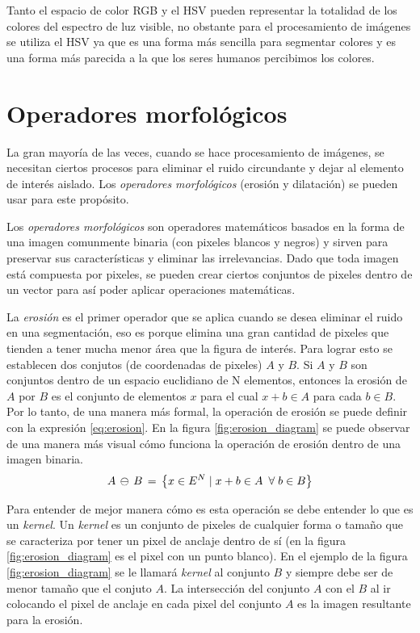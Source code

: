 Tanto el espacio de color RGB y el HSV pueden representar la totalidad de los colores del espectro de luz visible, no obstante para el procesamiento de imágenes se utiliza el HSV ya que es una forma más sencilla para segmentar colores y es una forma más parecida a la que los seres humanos percibimos los colores.

	\section{Operadores morfológicos}	
La gran mayoría de las veces, cuando se hace procesamiento de imágenes, se necesitan ciertos procesos para eliminar el ruido circundante y dejar al elemento de interés aislado. Los \textit{operadores morfológicos} (erosión y dilatación) se pueden usar para este propósito.

Los \textit{operadores morfológicos} son operadores matemáticos basados en la forma de una imagen comunmente binaria (con pixeles blancos y negros) y sirven para preservar sus características y eliminar las irrelevancias. Dado que toda imagen está compuesta por pixeles, se pueden crear ciertos conjuntos de pixeles dentro de un vector para así poder aplicar operaciones matemáticas. 

La \textit{erosión} es el primer operador que se aplica cuando se desea eliminar el ruido en una segmentación, eso es porque elimina una gran cantidad de pixeles que tienden a tener mucha menor área que la figura de interés. Para lograr esto se establecen dos conjutos (de coordenadas de pixeles) $A$ y $B$. Si $A$ y $B$ son conjuntos dentro de un espacio euclidiano de N elementos, entonces la erosión de $A$ por $B$ es el conjunto de elementos $x$ para el cual $x + b \in  A$ para cada $b \in B$. Por lo tanto, de una manera más formal, la operación de erosión se puede definir con la expresión \ref{eq:erosion}.
En la figura \ref{fig:erosion_diagram} se puede observar de una manera más visual cómo funciona la operación de erosión dentro de una imagen binaria.
\begin{equation}
A\thinspace\ominus\thinspace B\thinspace=\thinspace \left \{ x \in E^N  \mid x+b \in A \enspace \forall \; b \in B\right \}
\label{eq:erosion}
\end{equation}

 Para entender de mejor manera cómo es esta operación se debe entender lo que es un \textit{kernel}. Un \textit{kernel} es un conjunto de pixeles de cualquier forma o tamaño que se caracteriza por tener un pixel de anclaje dentro de sí (en la figura \ref{fig:erosion_diagram} es el pixel con un punto blanco). En el ejemplo de la figura \ref{fig:erosion_diagram} se le llamará \textit{kernel} al conjunto $B$ y siempre debe ser de menor tamaño que el conjuto $A$. La intersección del conjunto $A$ con el $B$ al ir colocando el pixel de anclaje en cada pixel del conjunto $A$ es la imagen resultante para la erosión.
 
